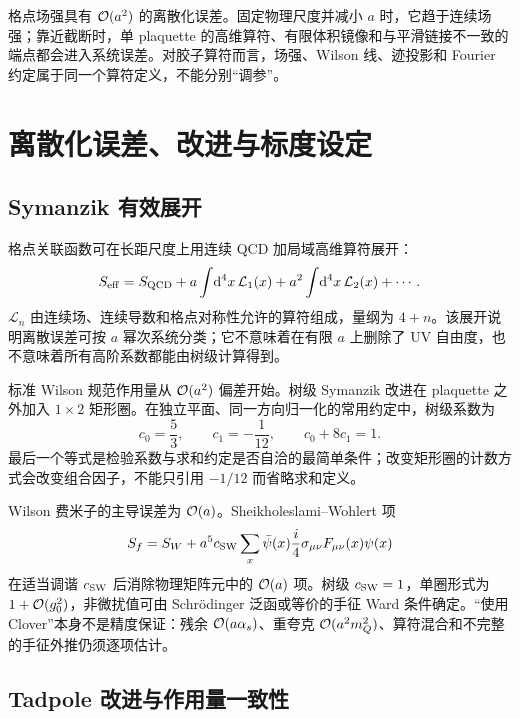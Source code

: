 格点场强具有 \(\mathcal{O}(a^2)\) 的离散化误差。固定物理尺度并减小 \(a\) 时，它趋于连续场强；靠近截断时，单 plaquette 的高维算符、有限体积镜像和与平滑链接不一致的端点都会进入系统误差。对胶子算符而言，场强、Wilson 线、迹投影和 Fourier 约定属于同一个算符定义，不能分别“调参”。

\chapter{离散化误差、改进与标度设定}

\section{Symanzik 有效展开}

格点关联函数可在长距尺度上用连续 QCD 加局域高维算符展开：
\begin{equation}
  S_{\rm eff}=S_{\rm QCD}
  +a\int\!\mathrm{d}^4x\,\mathcal L_1(x)
  +a^2\int\!\mathrm{d}^4x\,\mathcal L_2(x)+\cdots .
  \label{eq:symanzik}
\end{equation}
\(\mathcal L_n\) 由连续场、连续导数和格点对称性允许的算符组成，量纲为 \(4+n\)。该展开说明离散误差可按 \(a\) 幂次系统分类；它不意味着在有限 \(a\) 上删除了 UV 自由度，也不意味着所有高阶系数都能由树级计算得到。

标准 Wilson 规范作用量从 \(\mathcal{O}(a^2)\) 偏差开始。树级 Symanzik 改进在 plaquette 之外加入 \(1\times2\) 矩形圈。在独立平面、同一方向归一化的常用约定中，树级系数为
\begin{equation}
  c_0=\frac53,\qquad c_1=-\frac1{12},
  \qquad c_0+8c_1=1.
  \label{eq:symanzik-coefficients}
\end{equation}
最后一个等式是检验系数与求和约定是否自洽的最简单条件；改变矩形圈的计数方式会改变组合因子，不能只引用 \(-1/12\) 而省略求和定义。

Wilson 费米子的主导误差为 \(\mathcal{O}(a)\)。Sheikholeslami--Wohlert 项
\begin{equation}
  S_f=S_W+a^5c_{\rm SW}\sum_x
  \bar\psi(x)\frac{i}{4}\sigma_{\mu\nu}F_{\mu\nu}(x)\psi(x)
  \label{eq:b01-clover-action}
\end{equation}
在适当调谐 \(c_{\rm SW}\) 后消除物理矩阵元中的 \(\mathcal{O}(a)\) 项。树级 \(c_{\rm SW}=1\)，单圈形式为 \(1+\mathcal{O}(g_0^2)\)，非微扰值可由 Schrödinger 泛函或等价的手征 Ward 条件确定。“使用 Clover”本身不是精度保证：残余 \(\mathcal{O}(a\alpha_s)\)、重夸克 \(\mathcal{O}(a^2m_Q^2)\)、算符混合和不完整的手征外推仍须逐项估计。

\section{Tadpole 改进与作用量一致性}

